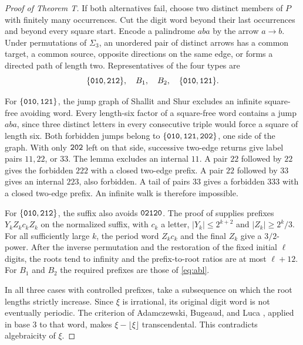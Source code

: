 \begin{proof}[Proof of Theorem T]
If both alternatives fail, choose two distinct members of \(P\)
with finitely many occurrences. Cut the digit word beyond their
last occurrences and beyond every square start. Encode a palindrome
\(aba\) by the arrow \(a\to b\). Under permutations of \(\Sigma_3\),
an unordered pair of distinct arrows has a common target, a common
source, opposite directions on the same edge, or forms a directed
path of length two. Representatives of the four types are
\[
\{\mathtt{010},\mathtt{212}\},\quad B_1,\quad B_2,\quad
\{\mathtt{010},\mathtt{121}\}.
\]

For \(\{\mathtt{010},\mathtt{121}\}\), the jump graph of Shallit and Shur
\cite[\S3.1, Figure 1 and Lemma 21(2)]{SS} excludes an infinite
square-free avoiding word. Every length-six factor of a square-free
word contains a jump \(aba\), since three distinct letters in every
consecutive triple would force a square of length six. Both
forbidden jumps belong to
\(\{\mathtt{010},\mathtt{121},\mathtt{202}\}\), one side of the graph.
With only \(\mathtt{202}\) left on that side, successive two-edge
returns give label pairs \(11,22\), or \(33\). The lemma excludes
an internal \(11\). A pair \(22\) followed by \(22\) gives the
forbidden \(222\) with a closed two-edge prefix. A pair \(22\)
followed by \(33\) gives an internal \(223\), also forbidden.
A tail of pairs \(33\) gives a forbidden \(333\) with a closed
two-edge prefix. An infinite walk is therefore impossible.

For \(\{\mathtt{010},\mathtt{212}\}\), the suffix also avoids
\(\mathtt{02120}\). The proof of \cite[Theorem 3.1]{AR} supplies
prefixes \(Y_k Z_k c_k Z_k\) on the normalized suffix, with
\(c_k\) a letter, \(|Y_k|\le2^{k+2}\) and \(|Z_k|\ge2^k/3\).
For all sufficiently large \(k\), the period word \(Z_kc_k\)
and the final \(Z_k\) give a \(3/2\)-power. After the inverse
permutation and the restoration of the fixed initial \(\ell\)
digits, the roots tend to infinity and the prefix-to-root ratios
are at most \(\ell+12\). For \(B_1\) and \(B_2\) the required
prefixes are those of \eqref{eq:abl}.

In all three cases with controlled prefixes, take a subsequence
on which the root lengths strictly increase. Since \(\xi\) is
irrational, its original digit word is not eventually periodic.
The criterion of Adamczewski, Bugeaud, and Luca
\cite[Theorem 1]{ABL}, applied in base \(3\) to that word, makes
\(\xi-\lfloor\xi\rfloor\) transcendental. This contradicts
algebraicity of \(\xi\).
\end{proof}

